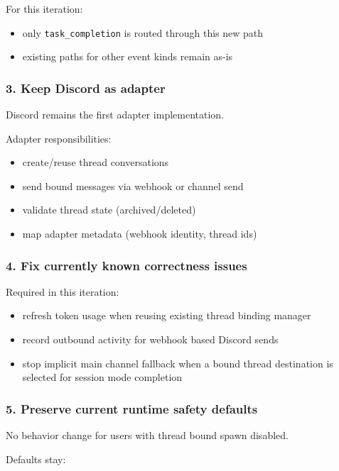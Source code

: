 For this iteration:

\begin{itemize}
  \item only \texttt{task\_completion} is routed through this new path
  \item existing paths for other event kinds remain as-is
\end{itemize}


\subsubsection{3. Keep Discord as adapter}


Discord remains the first adapter implementation.

Adapter responsibilities:

\begin{itemize}
  \item create/reuse thread conversations
  \item send bound messages via webhook or channel send
  \item validate thread state (archived/deleted)
  \item map adapter metadata (webhook identity, thread ids)
\end{itemize}


\subsubsection{4. Fix currently known correctness issues}


Required in this iteration:

\begin{itemize}
  \item refresh token usage when reusing existing thread binding manager
  \item record outbound activity for webhook based Discord sends
  \item stop implicit main channel fallback when a bound thread destination is selected for session mode completion
\end{itemize}


\subsubsection{5. Preserve current runtime safety defaults}


No behavior change for users with thread bound spawn disabled.

Defaults stay:

